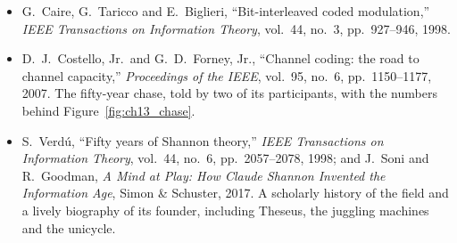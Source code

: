 \begin{itemize}
\item G.~Caire, G.~Taricco and E.~Biglieri, ``Bit-interleaved coded modulation,'' \emph{IEEE
Transactions on Information Theory}, vol.~44, no.~3, pp.~927--946, 1998.
\item D.~J.~Costello, Jr.\ and G.~D.~Forney, Jr., ``Channel coding: the road to channel capacity,''
\emph{Proceedings of the IEEE}, vol.~95, no.~6, pp.~1150--1177, 2007. The fifty-year chase, told by
two of its participants, with the numbers behind Figure~\ref{fig:ch13_chase}.
\item S.~Verd\'u, ``Fifty years of Shannon theory,'' \emph{IEEE Transactions on Information Theory},
vol.~44, no.~6, pp.~2057--2078, 1998; and J.~Soni and R.~Goodman, \emph{A Mind at Play: How Claude
Shannon Invented the Information Age}, Simon \& Schuster, 2017. A scholarly history of the field and
a lively biography of its founder, including Theseus, the juggling machines and the unicycle.
\end{itemize}
